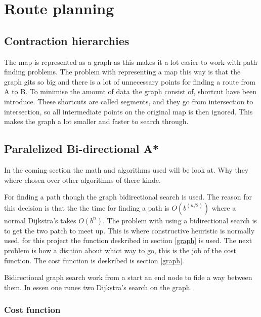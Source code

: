 \section{Route planning}

\subsection{Contraction hierarchies}\label{contraction-hierarchies}
The map is represented as a graph as this makes it a lot easier to work with path finding problems. The problem with representing a map this way is that the graph gits so big and there is a lot of unnecessary points for finding a route from A to B. To minimise the amount of data the graph consist of, shortcut have been introduce. These shortcuts are called segments, and they go from intersection to intersection, so all intermediate points on the original map is then ignored. This makes the graph a lot smaller and faster to search through.

\subsection{Paralelized Bi-directional A*} \label{algorithms}
In the coming section the math and algorithms used will be look at. Why they where chosen over other algorithms of there kinde.

For finding a path though the graph bidirectional search is used. The reason for this decision is that the the time for finding a path is $O(b^{(n/2)})$ where a normal Dijkstra’s takes $O(b^{n})$. The problem with using a bidirectional search is to get the two patch to meet up. This is where constructive heuristic is normally used, for this project the function deskribed in section \ref{graph} is used. The next problem is how a disition about whict way to go, this is the job of the cost function. The cost function is deskribed is section \ref{graph}.

Bidirectional graph search work from a start an end node to fide a way between them. In essen one runes two Dijkstra's search on the graph.

\subsubsection{Cost function}
